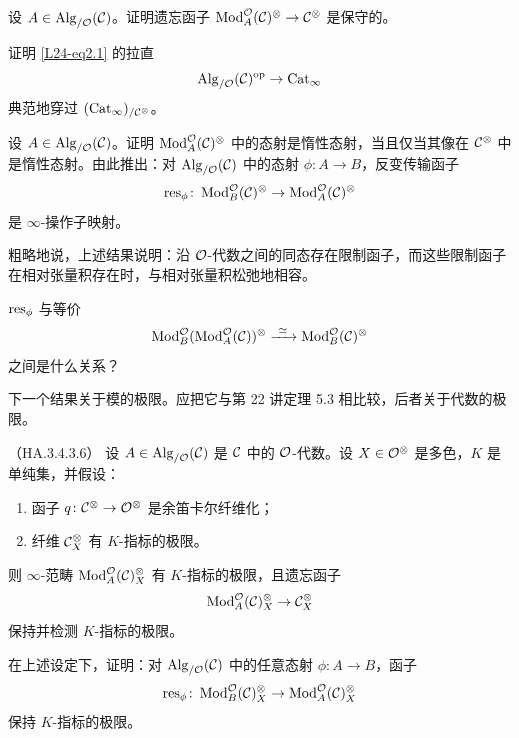 \begin{exercise}\label{L24-2.2}
设 $A\in\operatorname{Alg}_{/\mathcal{O}}(\mathcal{C})$。证明遗忘函子 $\operatorname{Mod}^{\mathcal{O}}_{A}(\mathcal{C})^{\otimes}\to\mathcal{C}^{\otimes}$ 是保守的。
\end{exercise}

\begin{exercise}\label{L24-2.3}
证明 \eqref{L24-eq2.1} 的拉直
\[
\operatorname{Alg}_{/\mathcal{O}}(\mathcal{C})^{\mathrm{op}}\to\operatorname{Cat}_{\infty}
\]
典范地穿过 $(\operatorname{Cat}_{\infty})_{/\mathcal{C}^{\otimes}}$。
\end{exercise}

\begin{exercise}\label{L24-2.4}
设 $A\in\operatorname{Alg}_{/\mathcal{O}}(\mathcal{C})$。证明 $\operatorname{Mod}^{\mathcal{O}}_{A}(\mathcal{C})^{\otimes}$ 中的态射是惰性态射，当且仅当其像在 $\mathcal{C}^{\otimes}$ 中是惰性态射。由此推出：对 $\operatorname{Alg}_{/\mathcal{O}}(\mathcal{C})$ 中的态射 $\phi\colon A\to B$，反变传输函子
\[
\operatorname{res}_{\phi}\colon\operatorname{Mod}^{\mathcal{O}}_{B}(\mathcal{C})^{\otimes}\to\operatorname{Mod}^{\mathcal{O}}_{A}(\mathcal{C})^{\otimes}
\]
是 $\infty$-操作子映射。
\end{exercise}

\begin{remark}\label{L24-2.5}
粗略地说，上述结果说明：沿 $\mathcal{O}$-代数之间的同态存在限制函子，而这些限制函子在相对张量积存在时，与相对张量积松弛地相容。
\end{remark}

\begin{exercise}\label{L24-2.6}
$\operatorname{res}_{\phi}$ 与等价
\[
\Mod^{\OO}_{B}(\Mod^{\OO}_{A}(\cC))^{\otimes}\xrightarrow{\ \simeq\ }\Mod^{\OO}_{B}(\cC)^{\otimes}
\]
之间是什么关系？
\end{exercise}

\nitem\label{L24-2.7} 下一个结果关于模的极限。应把它与第 22 讲定理 5.3 相比较，后者关于代数的极限。

\begin{theorem}\label{L24-2.8}（HA.3.4.3.6）
设 $A\in\operatorname{Alg}_{/\mathcal{O}}(\mathcal{C})$ 是 $\mathcal{C}$ 中的 $\mathcal{O}$-代数。设 $X\in\mathcal{O}^{\otimes}$ 是多色，$K$ 是单纯集，并假设：
\begin{enumerate}[label=(\roman*),leftmargin=2.4em,itemsep=0.1em]
\item 函子 $q\colon\mathcal{C}^{\otimes}\to\mathcal{O}^{\otimes}$ 是余笛卡尔纤维化；
\item 纤维 $\mathcal{C}^{\otimes}_{X}$ 有 $K$-指标的极限。
\end{enumerate}
则 $\infty$-范畴 $\operatorname{Mod}^{\mathcal{O}}_{A}(\mathcal{C})^{\otimes}_{X}$ 有 $K$-指标的极限，且遗忘函子
\[
\operatorname{Mod}^{\mathcal{O}}_{A}(\mathcal{C})^{\otimes}_{X}\to\mathcal{C}^{\otimes}_{X}
\]
保持并检测 $K$-指标的极限。
\end{theorem}

\begin{exercise}\label{L24-2.9}
在上述设定下，证明：对 $\operatorname{Alg}_{/\mathcal{O}}(\mathcal{C})$ 中的任意态射 $\phi\colon A\to B$，函子
\[
\operatorname{res}_{\phi}\colon\operatorname{Mod}^{\mathcal{O}}_{B}(\mathcal{C})^{\otimes}_{X}\to\operatorname{Mod}^{\mathcal{O}}_{A}(\mathcal{C})^{\otimes}_{X}
\]
保持 $K$-指标的极限。
\end{exercise}


